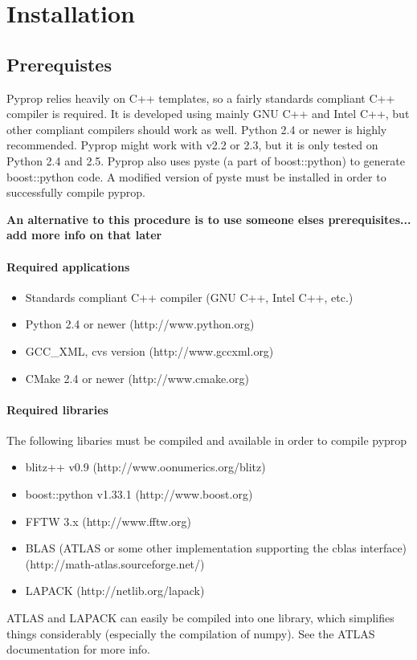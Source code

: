 
\chapter{Installation}
\section{Prerequistes}
Pyprop relies heavily on C++ templates, so a fairly standards compliant C++ compiler is required.
It is developed using mainly GNU C++ and Intel C++, but other compliant compilers should work as well.
Python 2.4 or newer is highly recommended. Pyprop might work with v2.2 or 2.3, but it is only tested on
Python 2.4 and 2.5. Pyprop also uses pyste (a part of boost::python) to generate boost::python code. 
A modified version of pyste must be installed in order to successfully compile pyprop.

\textbf{An alternative to this procedure is to use someone elses prerequisites... add more info on that later}

\subsubsection*{Required applications}
\begin{itemize}
\item Standards compliant C++ compiler (GNU C++, Intel C++, etc.)
\item Python 2.4 or newer (http://www.python.org)
\item GCC\_XML, cvs version (http://www.gccxml.org)
\item CMake 2.4 or newer (http://www.cmake.org)
\end{itemize}
	
\subsubsection*{Required libraries}
The following libaries must be compiled and available in order to compile pyprop
\begin{itemize}
\item blitz++ v0.9 (http://www.oonumerics.org/blitz)
\item boost::python v1.33.1 (http://www.boost.org)
\item FFTW 3.x (http://www.fftw.org)
\item BLAS (ATLAS or some other implementation supporting the cblas interface) (http://math-atlas.sourceforge.net/)
\item LAPACK (http://netlib.org/lapack)
\end{itemize}
ATLAS and LAPACK can easily be compiled into one library, which simplifies things considerably (especially the compilation
of numpy). See the ATLAS documentation for more info.

